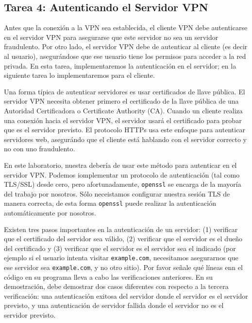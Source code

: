 \subsection{Tarea 4: Autenticando el Servidor VPN}

Antes que la conexión a la VPN sea establecida, el cliente VPN debe autenticarse en el servidor VPN para asegurarse que este servidor no sea un servidor fraudulento.
Por otro lado, el servidor VPN debe de autenticar al cliente (es decir al usuario), asegurándose que ese usuario tiene los permisos para acceder a la red privada.
En esta tarea, implementaremos la autenticación en el servidor; en la siguiente tarea lo implementaremos para el cliente.

Una forma típica de autenticar servidores es usar certificados de llave pública. El servidor VPN necesita obtener primero el certificado de la llave pública de una Autoridad Certificadora o Certificate Authority (CA). Cuando un cliente realiza una conexión hacia el servidor VPN, el servidor usará el certificado para probar que es el servidor previsto.
El protocolo HTTPs usa este enfoque para autenticar servidores web, asegurándo que el cliente está hablando con el servidor correcto y no con uno fraudulento.

En este laboratorio, nuestra \miniVPN debería de usar este método para autenticar en el servidor VPN. Podemos iomplementar un protocolo de autenticación (tal como TLS/SSL) desde cero, pero afortunadamente, \texttt{openssl} se encarga de la mayoría del trabajo por nosotros. Sólo neceistamos configurar nuestra sesión TLS de manera correcta, de esta forma \texttt{openssl} puede realizar la autenticación automáticamente por nosotros.

Existen tres pasos importantes en la autenticación de un servidor: (1) verificar que el certificado del servidor sea válido, (2) verificar que el servidor es el dueño del certificado y (3) verificar que el servidor es el servidor sea el indicado (por ejemplo si el usuario intenta visitar \texttt{example.com}, necesitamos asegurarnos que ese servidor sea \texttt{example.com}, y no  otro sitio). Por favor señale qué líneas enn el código en su programa lleva a cabo las verificaciones anteriores.
En su demostración, debe demostrar dos casos diferentes con respecto a la tercera verificación: una autenticación exitosa del servidor donde el servidor es el servidor previsto, y una autenticación de servidor fallida donde el servidor no es el servidor previsto.

